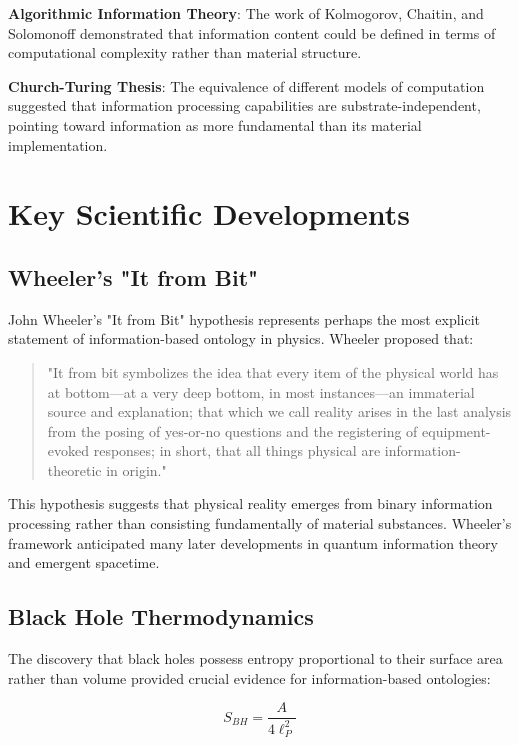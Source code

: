 \documentclass[12pt]{article}
\begin{document}
\textbf{Algorithmic Information Theory}: The work of Kolmogorov, Chaitin, and Solomonoff demonstrated that information content could be defined in terms of computational complexity rather than material structure.

\textbf{Church-Turing Thesis}: The equivalence of different models of computation suggested that information processing capabilities are substrate-independent, pointing toward information as more fundamental than its material implementation.

\section{Key Scientific Developments}

\subsection{Wheeler's "It from Bit"}

John Wheeler's "It from Bit" hypothesis represents perhaps the most explicit statement of information-based ontology in physics. Wheeler proposed that:

\begin{quote}
"It from bit symbolizes the idea that every item of the physical world has at bottom—at a very deep bottom, in most instances—an immaterial source and explanation; that which we call reality arises in the last analysis from the posing of yes-or-no questions and the registering of equipment-evoked responses; in short, that all things physical are information-theoretic in origin."
\end{quote}

This hypothesis suggests that physical reality emerges from binary information processing rather than consisting fundamentally of material substances. Wheeler's framework anticipated many later developments in quantum information theory and emergent spacetime.

\subsection{Black Hole Thermodynamics}

The discovery that black holes possess entropy proportional to their surface area rather than volume provided crucial evidence for information-based ontologies:

\begin{equation}
S_{BH} = \frac{A}{4\ell_P^2}
\end{equation}
\end{document}
